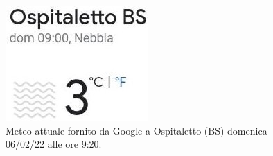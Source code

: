 \begin{figure}[h!]
	\centering
	\includegraphics[width=0.2\linewidth]{./Iterazione 3/ImageFiles/Nebbia Ospitaletto Google}
	\caption{Meteo attuale fornito da Google a Ospitaletto (BS) domenica 06/02/22 alle ore 9:20.}
	\label{fig:test_previsione_google}
\end{figure}
